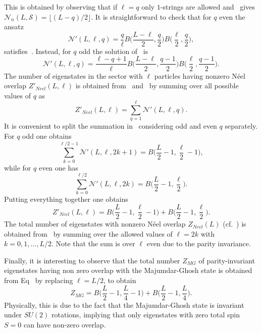 \documentclass[11pt]{iopart}
\begin{document}
%
This is obtained by observing that if $\ell=q$ only $1$-strings are allowed 
and~ gives ${\mathcal N}_n(L,{\mathcal S})=\lfloor (L-q)/2\rfloor$. 
It is straightforward to check that for $q$ even the ansatz 
%
\begin{equation}
\label{inter1}
{\mathcal N}'(L,\ell,q)=\frac{q}{\ell}B\Big(\frac{L-\ell}{2},\frac{q}{2}\Big)
B\Big(\frac{\ell}{2},\frac{q}{2}\Big),
\end{equation}
% 
satisfies~. Instead, for $q$ odd the solution of~ is 
%
\begin{equation}
\label{inter2}
{\mathcal N}'(L,\ell,q)=\frac{\ell-q+1}{\ell}B\Big(\frac{L-\ell}{2},\frac{q-1}{2}
\Big)B\Big(\frac{\ell}{2},\frac{q-1}{2}\Big).
\end{equation}
%
The number of eigenstates in the sector with $\ell$ particles having nonzero N\'eel 
overlap $Z'_{Neel}(L,\ell)$ is obtained from~ and~ by 
summing over all possible values of $q$ as 
%
\begin{equation}
\label{sum1}
Z'_{Neel}(L,\ell)=\sum\limits_{q=1}^\ell {\mathcal N}'(L,\ell,q).
\end{equation}
%
It is convenient to split the summation in~ considering odd and even 
$q$ separately. For $q$ odd one obtains 
%
\begin{equation}
\sum\limits_{k=0}^{\ell/2-1} {\mathcal N}'(L,\ell,2k+1)=B\Big(\frac{L}{2}-1,
\frac{\ell}{2}-1\Big),
\end{equation}
%
while for $q$ even one has 
%
\begin{equation}
\sum\limits_{k=0}^{\ell/2} {\mathcal N}'(L,\ell,2k)=B\Big(\frac{L}{2}-1,
\frac{\ell}{2}\Big). 
\end{equation}
%
Putting everything together one obtains 
%
\begin{equation}
\label{N-count-p}
Z'_{Neel}(L,\ell)=B\Big(\frac{L}{2}-1,
\frac{\ell}{2}-1\Big)+B\Big(\frac{L}{2}-1,
\frac{\ell}{2}\Big). 
\end{equation}
%
The total number of eigenstates with nonzero N\'eel overlap $Z_{Neel}(L)$ 
(cf.~) is obtained from~ by summing over the allowed 
values of $\ell=2k$ with $k=0,1,\dots,L/2$. Note that the sum is over $\ell$ even 
due to the parity invariance. 

Finally, it is interesting to observe that the total number $Z_{MG}$ of parity-invariant 
eigenstates having non zero overlap with the Majumdar-Ghosh state is obtained from 
Eq~ by replacing $\ell=L/2$, to obtain 
%
\begin{equation}
\label{p-inv-mg}
Z_{MG}=B\Big(\frac{L}{2}-1,\frac{L}{4}-1\Big)+B\Big(\frac{L}{2}-1,\frac{L}{4}
\Big). 
\end{equation}
%
Physically, this is due to the fact that the Majumdar-Ghosh state is invariant under 
$SU(2)$ rotations, implying that only eigenstates with zero total spin $S=0$ can have 
non-zero overlap. 
\end{document}
